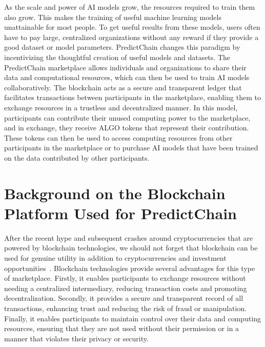\documentclass{ledger}
\begin{document}
As the scale and power of AI models grow, the resources required to train them also grow.  This makes the training of
useful machine learning models unattainable for most people.  To get useful results from these models, users often have
to pay large, centralized organizations without any reward if they provide a good dataset or model parameters.
PredictChain changes this paradigm by incentivizing the thoughtful creation of useful models and datasets.
The PredictChain marketplace allows individuals and organizations to share their data and computational resources, which
can then be used to train AI models collaboratively. The blockchain acts as a secure and transparent ledger that facilitates
transactions between participants in the marketplace, enabling them to exchange resources in a trustless and decentralized manner.
In this model, participants can contribute their unused computing power to the marketplace, and in exchange, they receive
ALGO tokens that represent their contribution. These tokens can then be used to access computing resources from other
participants in the marketplace or to purchase AI models that have been trained on the data contributed by other participants.


\section{Background on the Blockchain Platform Used for PredictChain}

After the recent hype and subsequent crashes around cryptocurrencies that are powered by blockchain technologies, we
should not forget that blockchain can be used for genuine utility in addition to cryptocurrencies and investment
opportunities~\cite{crosby2016blockchain}.  Blockchain technologies provide several advantages for this type of
marketplace. Firstly, it enables participants to exchange resources without needing a centralized intermediary, reducing
transaction costs and promoting decentralization. Secondly, it provides a secure and transparent record of all
transactions, enhancing trust and reducing the risk of fraud or manipulation. Finally, it enables participants to
maintain control over their data and computing resources, ensuring that they are not used without their permission or
in a manner that violates their privacy or security.
\end{document}
